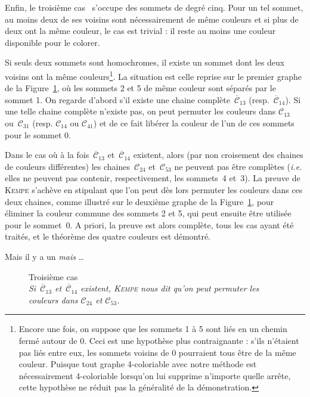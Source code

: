 Enfin, le troisième cas~\label{pg:Troisième} s'occupe des sommets de degré cinq. Pour un tel sommet, au moins deux de ses voisins sont nécessairement de même couleurs et si plus de deux ont la même couleur, le cas est trivial : il reste au moins une couleur disponible pour le colorer.

Si seuls deux sommets sont homochromes, il existe un sommet dont les deux voisins ont la même couleurs\footnote{Encore une fois, on suppose que les sommets 1 à 5 sont liés en un chemin fermé autour de 0. Ceci est une hypothèse plus contraignante : s'ils n'étaient pas liés entre eux, les sommets voisins de 0 pourraient tous être de la même couleur. Puisque tout graphe 4-coloriable avec notre méthode est nécessairement 4-coloriable lorsqu'on lui supprime n'importe quelle arrête, cette hypothèse ne réduit pas la généralité de la démonstration.}. La situation est celle reprise sur le premier graphe de la Figure~\ref{fig:Troisième}, où les sommets 2 et 5 de même couleur sont séparés par le sommet 1. On regarde d'abord s'il existe une chaine complète~$\overline{\mathcal{C}}_{13}$ (resp.~$\overline{\mathcal{C}}_{14}$). Si une telle chaine complète n'existe pas, on peut permuter les couleurs dans $\mathcal{C}_{13}$ ou~$\mathcal{C}_{31}$ (resp. $\mathcal{C}_{14}$ ou $\mathcal{C}_{41}$) et de ce fait libérer la couleur de l'un de ces sommets pour le sommet 0.

Dans le cas où à la fois~$\overline{\mathcal{C}}_{13}$ et~$\overline{\mathcal{C}}_{14}$ existent, alors (par non croisement des chaines de couleurs différentes) les chaines~$\mathcal{C}_{24}$ et~$\mathcal{C}_{53}$ ne peuvent pas être complètes (\textit{i.e.} elles ne peuvent pas contenir, respectivement, les sommets~4 et~3). La preuve de \textsc{Kempe} s'achève en stipulant que l'on peut dès lors permuter les couleurs dans ces deux chaines, comme illustré sur le deuxième graphe de la Figure~\ref{fig:Troisième}, pour éliminer la couleur commune des sommets 2 et 5, qui peut ensuite être utilisée pour le sommet~0. A priori, la preuve est alors complète, tous les cas ayant été traités, et le théorème des quatre couleurs est démontré.

Mais il y a un \textit{mais} …

\begin{figure}[h!]\centering
\begin{changemargin}{-3cm}{-3cm}
\begin{center}


\caption{Troisième cas\\ \footnotesize\textit{Si~$\overline{\mathcal{C}}_{13}$ et~$\overline{\mathcal{C}}_{14}$ existent, \textsc{Kempe} nous dit qu'on peut permuter les couleurs dans $\mathcal{C}_{24}$ et $\mathcal{C}_{53}$.}}\label{fig:Troisième}
\end{center}
\end{changemargin}
\end{figure}

